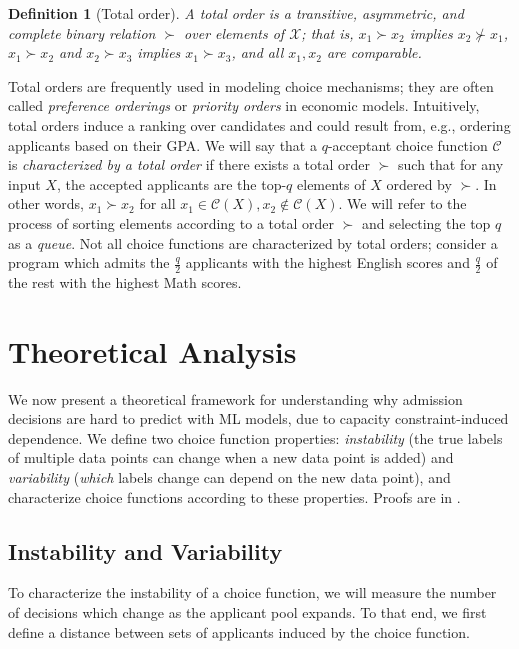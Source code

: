 \documentclass[letterpaper]{article}
\newtheorem{definition}{Definition}
\newcommand{\calX}{\mathcal{X}}
\newcommand{\choice}{\mathcal{C}}
\begin{document}
\begin{definition}[Total order] \label{def:total_order}
    A \emph{total order} is a transitive, asymmetric, and complete binary relation $\succ$ over elements of $\calX$; that is, $x_1 \succ x_2$ implies $x_2 \not\succ x_1$, $x_1 \succ x_2$ and $x_2 \succ x_3$ implies $x_1 \succ x_3$, and all $x_1, x_2$ are comparable.
\end{definition}

Total orders are frequently used in modeling choice mechanisms; they are often called \textit{preference orderings} or \textit{priority orders} in economic models.
Intuitively, total orders induce a ranking over candidates and could result from, e.g., ordering applicants based on their GPA.
We will say that a $q$-acceptant choice function $\mathcal C$ is \textit{characterized by a total order} if there exists a total order $\succ$ such that for any input $X$, the accepted applicants are the top-$q$ elements of $X$ ordered by $\succ$.
In other words,  $x_1 \succ x_2$ for all $x_1 \in \choice(X), x_2 \not\in\choice(X)$.
We will refer to the process of sorting elements according to a total order $\succ$ and selecting the top $q$ as a \textit{queue}.
Not all choice functions are characterized by total orders; consider a program which admits the $\frac{q}{2}$ applicants with the highest English scores and $\frac{q}{2}$ of the rest with the highest Math scores.

\section{Theoretical Analysis}\label{sec:theory}

We now present a theoretical framework for understanding why admission decisions are hard to predict with ML models, due to capacity constraint-induced dependence. We define two choice function properties: \emph{instability} (the true labels of multiple data points can change when a new data point is added) and \emph{variability} (\textit{which} labels change can depend on the new data point), and characterize choice functions according to these properties. Proofs are in .

\subsection{Instability and Variability} \label{sec:theory-definitions}

To characterize the instability of a choice function, we will measure the number of decisions which change as the applicant pool expands.
To that end, we first define a distance between sets of applicants induced by the choice function.
\end{document}

